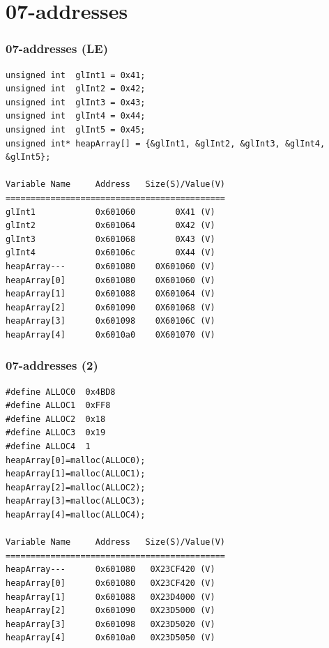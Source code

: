 \documentclass[aspectratio=169, xcolor=table, notheorems, hyperref={pdfpagelabels=false}]{beamer}
\begin{document}
\section{07-addresses}
\begin{frame}[fragile]
\frametitle{07-addresses (LE)}
\begin{lstlisting}[basicstyle=\ttfamily\footnotesize]
unsigned int  glInt1 = 0x41;
unsigned int  glInt2 = 0x42;
unsigned int  glInt3 = 0x43;
unsigned int  glInt4 = 0x44;
unsigned int  glInt5 = 0x45;
unsigned int* heapArray[] = {&glInt1, &glInt2, &glInt3, &glInt4, &glInt5};

Variable Name     Address   Size(S)/Value(V)
============================================
glInt1            0x601060        0X41 (V) 
glInt2            0x601064        0X42 (V) 
glInt3            0x601068        0X43 (V) 
glInt4            0x60106c        0X44 (V) 
heapArray---      0x601080    0X601060 (V) 
heapArray[0]      0x601080    0X601060 (V) 
heapArray[1]      0x601088    0X601064 (V) 
heapArray[2]      0x601090    0X601068 (V) 
heapArray[3]      0x601098    0X60106C (V) 
heapArray[4]      0x6010a0    0X601070 (V)
\end{lstlisting}

\end{frame}

\begin{frame}[fragile]
\frametitle{07-addresses (2)}
\begin{lstlisting}[basicstyle=\ttfamily\footnotesize]
#define ALLOC0  0x4BD8
#define ALLOC1  0xFF8
#define ALLOC2  0x18
#define ALLOC3  0x19
#define ALLOC4  1
heapArray[0]=malloc(ALLOC0);
heapArray[1]=malloc(ALLOC1);
heapArray[2]=malloc(ALLOC2);
heapArray[3]=malloc(ALLOC3);
heapArray[4]=malloc(ALLOC4);

Variable Name     Address   Size(S)/Value(V)
============================================
heapArray---      0x601080   0X23CF420 (V) 
heapArray[0]      0x601080   0X23CF420 (V) 
heapArray[1]      0x601088   0X23D4000 (V) 
heapArray[2]      0x601090   0X23D5000 (V) 
heapArray[3]      0x601098   0X23D5020 (V) 
heapArray[4]      0x6010a0   0X23D5050 (V)
\end{lstlisting}

\end{frame}
\end{document}
